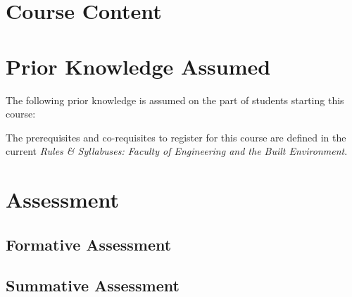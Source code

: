 \documentclass[11pt]{eie-cbo}
\begin{document}
\section{Course Content}\label{sec:content}
\begin{description}
		\item []
		\item []
		\item [] 		
\end{description}	


\section{Prior Knowledge Assumed}\label{sec:prior}
The following prior knowledge is assumed on the part of students starting this course: 

The prerequisites and co-requisites to register for this course are defined in the current \emph{Rules \& Syllabuses: Faculty of Engineering and the Built Environment}.

\section{Assessment}\label{assessment}

\subsection{Formative Assessment}\label{formative}

\pagebreak
\subsection{Summative Assessment}\label{summative}
\end{document}
